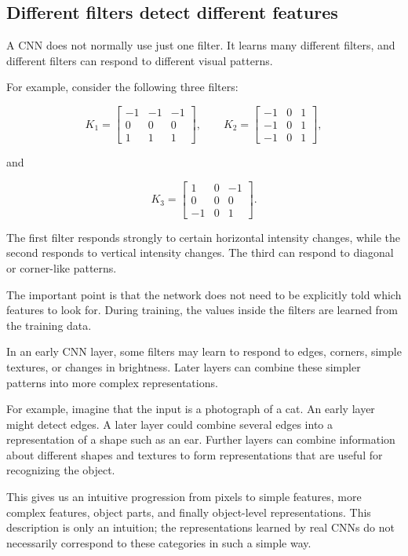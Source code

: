 \documentclass{course_sheet}
\begin{document}
\subsection*{Different filters detect different features}

A CNN does not normally use just one filter. It learns many different filters, and different filters can respond to different visual patterns.

For example, consider the following three filters:

\[
K_1 =
\begin{bmatrix}
-1 & -1 & -1\\
0 & 0 & 0\\
1 & 1 & 1
\end{bmatrix},
\qquad
K_2 =
\begin{bmatrix}
-1 & 0 & 1\\
-1 & 0 & 1\\
-1 & 0 & 1
\end{bmatrix},
\]

and

\[
K_3 =
\begin{bmatrix}
1 & 0 & -1\\
0 & 0 & 0\\
-1 & 0 & 1
\end{bmatrix}.
\]

The first filter responds strongly to certain horizontal intensity changes, while the second responds to vertical intensity changes. The third can respond to diagonal or corner-like patterns.

The important point is that the network does not need to be explicitly told which features to look for. During training, the values inside the filters are learned from the training data.

In an early CNN layer, some filters may learn to respond to edges, corners, simple textures, or changes in brightness. Later layers can combine these simpler patterns into more complex representations.

For example, imagine that the input is a photograph of a cat. An early layer might detect edges. A later layer could combine several edges into a representation of a shape such as an ear. Further layers can combine information about different shapes and textures to form representations that are useful for recognizing the object.

This gives us an intuitive progression from pixels to simple features, more complex features, object parts, and finally object-level representations. This description is only an intuition; the representations learned by real CNNs do not necessarily correspond to these categories in such a simple way.
\end{document}
